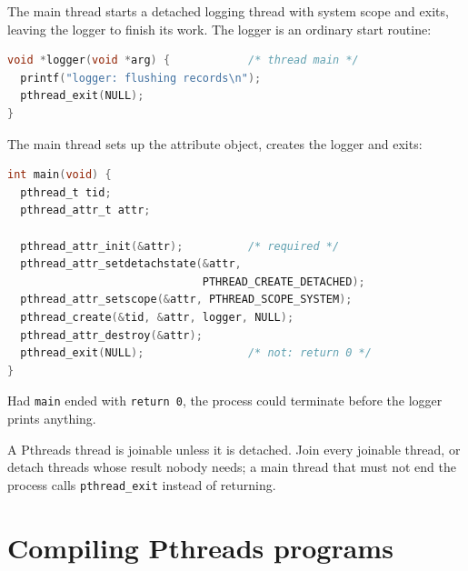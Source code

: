 \documentclass[../main.tex]{subfiles}
\begin{document}
\begin{example}
  \label{ex:l04-detached}
  The main thread starts a detached logging thread with system scope and
  exits, leaving the logger to finish its work.  The logger is an ordinary
  start routine:
  \begin{lstlisting}[language=C, numbers=none]
void *logger(void *arg) {            /* thread main */
  printf("logger: flushing records\n");
  pthread_exit(NULL);
}
\end{lstlisting}
  The main thread sets up the attribute object, creates the logger and
  exits:
  \begin{lstlisting}[language=C, numbers=none]
int main(void) {
  pthread_t tid;
  pthread_attr_t attr;

  pthread_attr_init(&attr);          /* required */
  pthread_attr_setdetachstate(&attr,
                              PTHREAD_CREATE_DETACHED);
  pthread_attr_setscope(&attr, PTHREAD_SCOPE_SYSTEM);
  pthread_create(&tid, &attr, logger, NULL);
  pthread_attr_destroy(&attr);
  pthread_exit(NULL);                /* not: return 0 */
}
\end{lstlisting}
  Had \texttt{main} ended with \texttt{return 0}, the process could
  terminate before the logger prints anything.
\end{example}

\begin{keypoint}
  A Pthreads thread is joinable unless it is detached.  Join every joinable
  thread, or detach threads whose result nobody needs; a main thread that
  must not end the process calls \texttt{pthread\_exit} instead of
  returning.
\end{keypoint}

\section{Compiling Pthreads programs}
\label{sec:l04-compiling}
\end{document}
